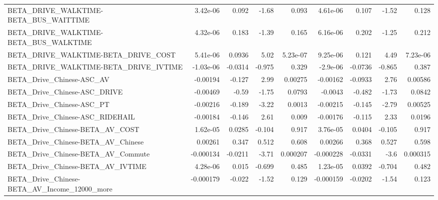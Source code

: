 \begin{tabular}{lrrrrrrrr}
BETA\_DRIVE\_WALKTIME-BETA\_BUS\_WAITTIME              &    3.42e-06 &        0.092 &    -1.68 &    0.093 &   4.61e-06 &       0.107 &        -1.52 &         0.128 \\
BETA\_DRIVE\_WALKTIME-BETA\_BUS\_WALKTIME              &    4.32e-06 &        0.183 &    -1.39 &    0.165 &   6.16e-06 &       0.202 &        -1.25 &         0.212 \\
BETA\_DRIVE\_WALKTIME-BETA\_DRIVE\_COST                &    5.41e-06 &       0.0936 &     5.02 & 5.23e-07 &   9.25e-06 &       0.121 &         4.49 &      7.23e-06 \\
BETA\_DRIVE\_WALKTIME-BETA\_DRIVE\_IVTIME              &   -1.03e-06 &      -0.0314 &   -0.975 &    0.329 &   -2.9e-06 &     -0.0736 &       -0.865 &         0.387 \\
BETA\_Drive\_Chinese-ASC\_AV                          &    -0.00194 &       -0.127 &     2.99 &  0.00275 &   -0.00162 &     -0.0933 &         2.76 &       0.00586 \\
BETA\_Drive\_Chinese-ASC\_DRIVE                       &    -0.00469 &        -0.59 &    -1.75 &   0.0793 &    -0.0043 &      -0.482 &        -1.73 &        0.0842 \\
BETA\_Drive\_Chinese-ASC\_PT                          &    -0.00216 &       -0.189 &    -3.22 &   0.0013 &   -0.00215 &      -0.145 &        -2.79 &       0.00525 \\
BETA\_Drive\_Chinese-ASC\_RIDEHAIL                    &    -0.00184 &       -0.146 &     2.61 &    0.009 &   -0.00176 &      -0.115 &         2.33 &        0.0196 \\
BETA\_Drive\_Chinese-BETA\_AV\_COST                    &    1.62e-05 &       0.0285 &   -0.104 &    0.917 &   3.76e-05 &      0.0404 &       -0.105 &         0.917 \\
BETA\_Drive\_Chinese-BETA\_AV\_Chinese                 &     0.00261 &        0.347 &    0.512 &    0.608 &    0.00266 &       0.368 &        0.527 &         0.598 \\
BETA\_Drive\_Chinese-BETA\_AV\_Commute                 &   -0.000134 &      -0.0211 &    -3.71 & 0.000207 &  -0.000228 &     -0.0331 &         -3.6 &      0.000315 \\
BETA\_Drive\_Chinese-BETA\_AV\_IVTIME                  &    4.28e-06 &        0.015 &   -0.699 &    0.485 &   1.23e-05 &      0.0392 &       -0.704 &         0.482 \\
BETA\_Drive\_Chinese-BETA\_AV\_Income\_12000\_more       &   -0.000179 &       -0.022 &    -1.52 &    0.129 &  -0.000159 &     -0.0202 &        -1.54 &         0.123 \\

\end{tabular}

